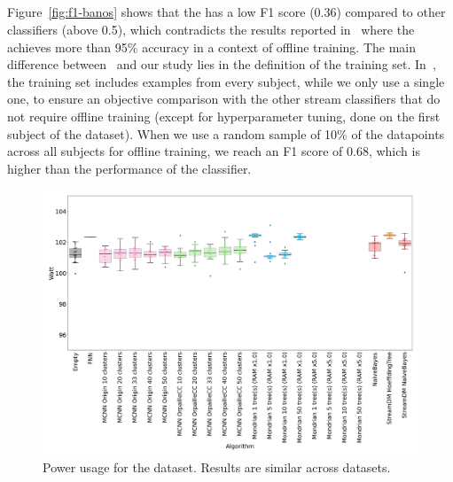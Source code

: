 \subsection{\FNN}

Figure~\ref{fig:f1-banos} shows that the \FNN has a low F1 score (0.36)
compared to other classifiers (above 0.5), which contradicts the results
reported in~\cite{omid_2019} where the \FNN achieves more than 95\%
accuracy in a context of offline training. The main difference
between~\cite{omid_2019} and our study lies in the definition of the
training set. In~\cite{omid_2019}, the training set includes examples from
every subject, while we only use a single one, to ensure an objective
comparison with the other stream classifiers that do not require offline
training (except for hyperparameter tuning, done on the first subject of
the \banosdataset dataset). When we use a random sample of 10\% of the
datapoints across all subjects for offline training, we reach an F1 score
of 0.68, which is higher than the performance of the \naivebayes classifier.


\begin{figure}
		\includegraphics[width=\linewidth]{figures/results/banos_3_watt.png}
		\caption{Power usage for the \banosdataset dataset. Results are similar across
		datasets.}
		\label{fig:power}
\end{figure}
